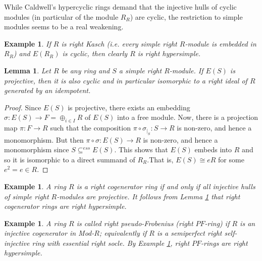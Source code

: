 \documentclass{amsart}
\theoremstyle{plain}
\newtheorem{example}[theorem]{Example}
\newtheorem{lemma}[theorem]{Lemma}
\numberwithin{equation}{section}
\begin{document}
While Caldwell's hypercyclic rings demand that the injective hulls of cyclic modules (in
particular of the module $R_{R}$) are cyclic, the restriction to simple modules seems to be a real weakening. 


\begin{example}
If $R$ is right Kasch (i.e. every simple right $R$-module is embedded in $R_{R}$) and $E (R_{R})$ is cyclic, then clearly $R$ is right hypersimple. 
\end{example}


\begin{lemma}
\label{projective_implies_cyclic} Let $R$ be any ring and $S$ a simple right $R$-module. If $E (S)$ is projective, then it is also cyclic and in particular isomorphic to a right ideal of $R$ generated by an idempotent. 
\end{lemma}


\begin{proof}
Since $E (S)$ is projective, there exists an embedding $\sigma  :E (S) \rightarrow F = \oplus _{i \in I}R$ of $E (S)$ into a free module. Now, there is a projection map $\pi  :F \rightarrow R$ such that the composition $\pi  \circ \sigma _{ \mid _{S}} :S \rightarrow R$ is non-zero, and hence a monomorphism. But then $\pi  \circ \sigma  :E (S) \rightarrow R$ is non-zero, and hence a monomorphism since $S  \subseteq ^{e s s}E (S)$. This shows that $E (S)$ embeds into $R$ and so it is isomorphic to a direct summand of $R_{R}$.That is, $E (S) \cong e R$ for some $e^{2} =e \in R$. 
\end{proof}


\begin{example}\label{exa:cogenerator}
\label{example_cogenerator} A ring $R$ is a right cogenerator ring if and only if all injective hulls of simple right $R$-modules are projective. It follows from Lemma \ref{projective_implies_cyclic} that right cogenerator rings are right hypersimple. 
\end{example}


\begin{example}
A ring $R$ is called right pseudo-Frobenius (right $P F$-ring) if $R$ is an injective cogenerator in Mod-$R$; equivalently if $R$ is a semiperfect right self-injective ring with essential right socle. By Example \ref{exa:cogenerator}, right $P F$-rings are right hypersimple. 
\end{example}
\end{document}
